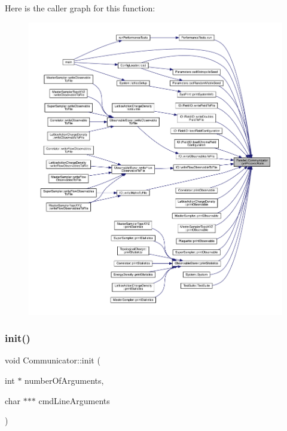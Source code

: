 Here is the caller graph for this function\+:
\nopagebreak
\begin{figure}[H]
\begin{center}
\leavevmode
\includegraphics[width=350pt]{class_parallel_1_1_communicator_a474ab433da0e83ef372d74e26a7e5cb0_icgraph}
\end{center}
\end{figure}
\mbox{\label{class_parallel_1_1_communicator_a4ed2a77c33cd899b31131e44fc906fd7}} 
\subsubsection{\texorpdfstring{init()}{init()}}
{\footnotesize\ttfamily void Communicator\+::init (\begin{DoxyParamCaption}\item[{int $\ast$}]{number\+Of\+Arguments,  }\item[{char $\ast$$\ast$$\ast$}]{cmd\+Line\+Arguments }\end{DoxyParamCaption})\hspace{0.3cm}{\ttfamily [static]}}



